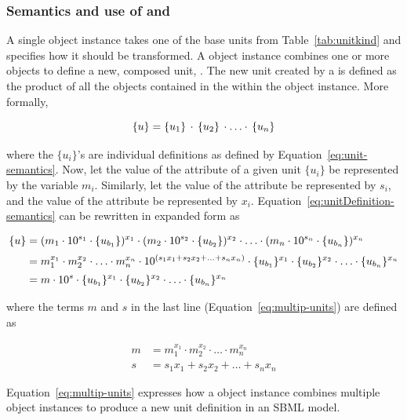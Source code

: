 \subsubsection{Semantics and use of \Unit and \UnitDefinition}
\label{sec:unit-structure:semantics}

A single \Unit object instance takes one of the base units from
Table~\ref{tab:unitkind} and specifies how it should be
transformed.  A \UnitDefinition object instance combines one or
more \Unit objects to define a new, composed unit, \udef.  The new
unit \udef created by a \UnitDefinition is defined as the product
of all the \Unit objects contained in the \ListOfUnits within the
\UnitDefinition object instance.  More formally, 
\begin{linenomath}
\begin{equation}
  \{u\} = \{u_1\} \, \cdot \, \{u_2\} \, \cdot \ldots \cdot \, \{u_n\} 
\label{eq:unitDefinition-semantics}
\end{equation}
\end{linenomath}
where the $\{u_i\}$'s are individual \Unit definitions as defined
by Equation~\ref{eq:unit-semantics}.  Now, let the value of the
 attribute of a given unit $\{u_i\}$ be
represented by the variable $m_i$.  Similarly, let the value of
the  attribute be represented by $s_i$, and the value
of the  attribute be represented by $x_i$.
Equation~\ref{eq:unitDefinition-semantics} can be rewritten in
expanded form as
\begin{linenomath}
\begin{align}
  \{u\} &= (m_1 \cdot 10^{s_1} \cdot \{u_{b_1}\})^{x_1} \cdot
           (m_2 \cdot 10^{s_2} \cdot \{u_{b_2}\})^{x_2} \cdot \ldots \cdot (m_n \cdot
           10^{s_n} \cdot \{u_{b_n}\})^{x_n} \notag \\[2pt]
        &= m_1^{x_1} \cdot m_2^{x_2} \cdot \ldots \cdot m_n^{x_n}
           \cdot 10^{(s_1 x_1 + s_2 x_2 + \ldots + s_n x_n)}
           \cdot \{u_{b_1}\}^{x_1} \cdot \{u_{b_2}\}^{x_2} \cdot \ldots \cdot \{u_{b_n}\}^{x_n} \notag \\[2pt]
        &= m \cdot 10^{s} \cdot \{u_{b_1}\}^{x_1} \cdot \{u_{b_2}\}^{x_2} \cdot \ldots \cdot \{u_{b_n}\}^{x_n}
\label{eq:multip-units}
\end{align}
\end{linenomath}
where the terms $m$ and $s$ in the last line
(Equation~\ref{eq:multip-units}) are defined as
\begin{linenomath}
\begin{align*}
  m &= m_1^{x_1} \cdot m_2^{x_2} \cdot \ldots \cdot m_n^{x_n} \\
  s &= s_1 x_1 + s_2 x_2 + \ldots + s_n x_n
\end{align*}
\end{linenomath}
Equation~\ref{eq:multip-units} expresses how a \UnitDefinition
object instance combines multiple \Unit object instances to
produce a new unit definition in an SBML model.


